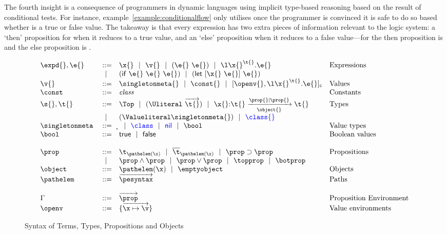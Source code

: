 The fourth insight is a consequence of
programmers in dynamic languages
using implicit type-based reasoning based on the result of
conditional tests.
For instance, example~\ref{example:conditionalflow}
only utilises  once
the programmer is convinced it is safe to do so based whether
is 
a true or false value. The takeaway is that every expression has
two extra pieces of information relevant to the logic system: a `then' proposition
for when it reduces to a true value, and an `else' proposition
when it reduces to a false value---for 
the then proposition is {} and 
the else proposition is {}.

\begin{figure}
  \footnotesize
$$
\begin{array}{lrll}
  \expd{}, \e{} &::=& \x{}
                      \alt \v{} 
                      \alt {\comb {\e{}} {\e{}}} 
                      \alt {\abs {\x{}} {\t{}} {\e{}}} &\mbox{Expressions} \\
                      &\alt& {\ifexp {\e{}} {\e{}} {\e{}}}
                      \alt {\letexp {\x{}} {\e{}} {\e{}}}\\
  \v{} &::=&          \singletonmeta{}
                      \alt {\const{}}
                      \alt {\closure {\openv{}} {\abs {\x{}} {\t{}} {\e{}}}}
                &\mbox{Values} \\
                \constantssyntax{}\\
  \s{}, \t{}    &::=& \Top 
                      \alt {\Unionsplice {\overrightarrow{\t{}}}}
                      \alt
                      {\ArrowOne {\x{}} {\t{}}
                                   {\t{}}
                                   {\filterset {\prop{}} {\prop{}}}
                                   {\object{}}}
                &\mbox{Types} \\
                      &\alt& {\Value \singletonmeta{}} 
                      \alt \trdiff{\class{}}\\
  \singletonallsyntax{}
                \\ \\
  \occurrencetypingsyntax{}\\
  \propenvsyntax{}\\
  \openvsyntax{}
\end{array}
$$
\caption{Syntax of Terms, Types, Propositions and Objects}
\label{main:figure:termsyntax}
\end{figure}


